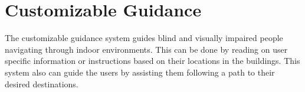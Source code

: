 \section{Customizable Guidance}
The customizable guidance system guides blind and visually impaired people navigating through indoor environments. This can be done by reading on user specific information or instructions based on their locations in the buildings. This system also can guide the users by assisting them following a path to their desired destinations.